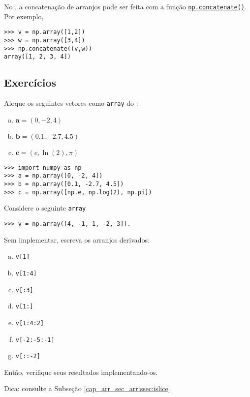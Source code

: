 \begin{obs}
  No {\numpy}, a concatenação de arranjos pode ser feita com a função \href{https://numpy.org/doc/stable/reference/generated/numpy.concatenate.html}{\texttt{np.concatenate()}}. Por exemplo,

\begin{lstlisting}
>>> v = np.array([1,2])
>>> w = np.array([3,4])
>>> np.concatenate((v,w))
array([1, 2, 3, 4])
\end{lstlisting}

\end{obs}

\subsection{Exercícios}

\begin{exer}
  Aloque os seguintes vetores como \lstinline+array+ do {\numpy}:
  \begin{enumerate}[a)]
  \item $\displaystyle\pmb{a} = (0, -2, 4)$
  \item $\displaystyle\pmb{b} = (0.1, -2.7, 4.5)$
  \item $\displaystyle\pmb{c} = (e, \ln(2), \pi)$
  \end{enumerate}
\end{exer}
\begin{resp}

\begin{lstlisting}
>>> import numpy as np
>>> a = np.array([0, -2, 4])
>>> b = np.array([0.1, -2.7, 4.5])
>>> c = np.array([np.e, np.log(2), np.pi])
\end{lstlisting}

\end{resp}

\begin{exer}
  Considere o seguinte \lstinline+array+

\begin{lstlisting}
>>> v = np.array([4, -1, 1, -2, 3]).
\end{lstlisting}

Sem implementar, escreva os arranjos derivados:
  \begin{enumerate}[a)]
  \item \lstinline+v[1]+
  \item \lstinline+v[1:4]+
  \item \lstinline+v[:3]+
  \item \lstinline+v[1:]+
  \item \lstinline+v[1:4:2]+
  \item \lstinline+v[-2:-5:-1]+
  \item \lstinline+v[::-2]+
  \end{enumerate}
  Então, verifique seus resultados implementando-os.
\end{exer}
\begin{resp}
  Dica: consulte a Subseção \ref{cap_arr_sec_arr:ssec:islice}. 
\end{resp}

